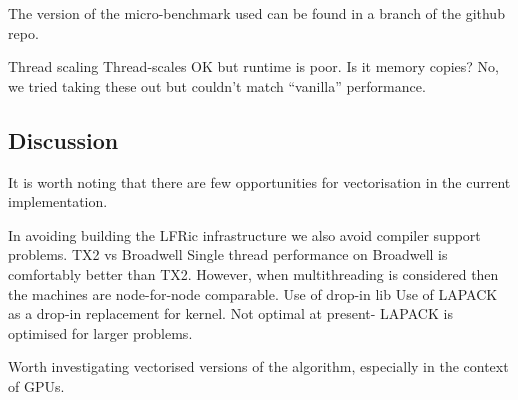 The version of the micro-benchmark used can be found in a branch of the github repo.

Thread scaling
Thread-scales OK but runtime is poor.
Is it memory copies? No, we tried taking these out but couldn't match ``vanilla'' performance.

\subsection{Discussion}

It is worth noting that there are few opportunities for vectorisation in the current implementation.

In avoiding building the LFRic infrastructure we also avoid compiler support problems.
TX2 vs Broadwell
Single thread performance on Broadwell is comfortably better than TX2. However, when multithreading is considered then the machines are node-for-node comparable.
Use of drop-in lib
Use of LAPACK as a drop-in replacement for kernel. Not optimal at present- LAPACK is optimised for larger problems.

Worth investigating vectorised versions of the algorithm, especially in the context of GPUs.
